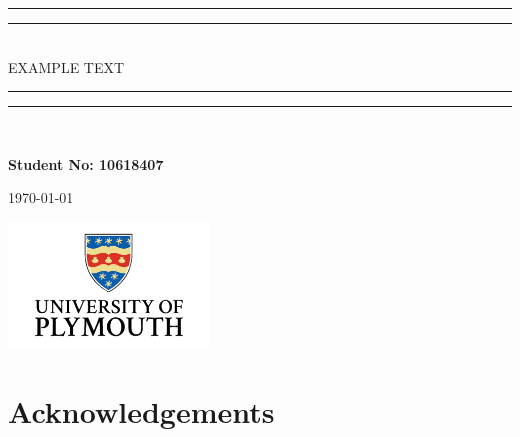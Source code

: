 \documentclass [12pt]{article}
\title{}
\author{}
\date{\today}
\begin{document}
\begin{titlepage}
    \begin{center}
        \vspace*{1cm}

        \vspace*{\baselineskip}

        \rule{\textwidth}{1.6pt}\vspace*{-\baselineskip}\vspace*{2pt}
        \rule{\textwidth}{0.4pt}\\

        {\LARGE EXAMPLE TEXT}\\[0.2\baselineskip]

        \rule{\textwidth}{0.4pt}\vspace*{-\baselineskip}\vspace{3.2pt}
        \rule{\textwidth}{1.6pt}\\[\baselineskip]
        \scshape

        \textbf{Student No: 10618407}

        \today

        \vfill

        \vspace{0.8cm}

        \includegraphics[width=0.4\textwidth]{UOP_Logo.png}

    \end{center}
\end{titlepage}

\newpage
{}
\tableofcontents
\listoffigures
\listoftables
\printglossaries

\newpage
\begin{abstract}

\end{abstract}
\section{Acknowledgements}

\newpage
{}
\end{document}
